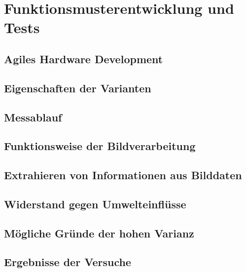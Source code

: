 \documentclass[a4paper,12pt]{article}
\begin{document}
\section{Funktionsmusterentwicklung und Tests}


\subsection{Agiles Hardware Development}


\subsection{Eigenschaften der Varianten}


\subsection{Messablauf}


\subsection{Funktionsweise der Bildverarbeitung}


\subsection{Extrahieren von Informationen aus Bilddaten}


\subsection{Widerstand gegen Umwelteinflüsse}


\subsection{Mögliche Gründe der hohen Varianz}

\newpage
\subsection{Ergebnisse der Versuche}


%
\end{document}
